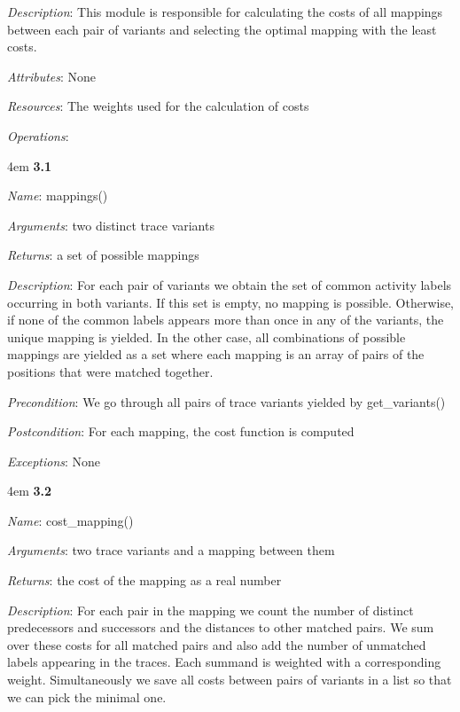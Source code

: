 \documentclass[notitlepage]{article}
\begin{document}
\begin{flushleft}
\textit{Description}: This module is responsible for calculating the costs of all mappings between each pair of variants and selecting the optimal mapping with the least costs. 

\textit{Attributes}: None

\textit{Resources}: The weights used for the calculation of costs

\textit{Operations}: 
\medskip

\par
\begingroup
\leftskip4em
\textbf{3.1} 

\textit{Name}: mappings()

\textit{Arguments}: two distinct trace variants 

\textit{Returns}: a set of possible mappings

\textit{Description}: For each pair of variants we obtain the set of common activity labels occurring in both variants. If this set is empty, no mapping is possible. Otherwise, if none of the common labels appears more than once in any of the variants, the unique mapping is yielded. In the other case, all combinations of possible mappings are yielded as a set where each mapping is an array of pairs of the positions that were matched together.

\textit{Precondition}: We go through all pairs of trace variants yielded by get\_variants()

\textit{Postcondition}: For each mapping, the cost function is computed

\textit{Exceptions}: None
\par
\endgroup


\medskip

\par
\begingroup
\leftskip4em
\textbf{3.2} 

\textit{Name}: cost\_mapping()

\textit{Arguments}: two trace variants and a mapping between them

\textit{Returns}: the cost of the mapping as a real number

\textit{Description}: For each pair in the mapping we count the number of distinct predecessors and successors and the distances to other matched pairs. We sum over these costs for all matched pairs and also add the number of unmatched labels appearing in the traces. Each summand is weighted with a corresponding weight.
Simultaneously we save all costs between pairs of variants in a list so that we can pick the minimal one.


\end{flushleft}
\end{document}
